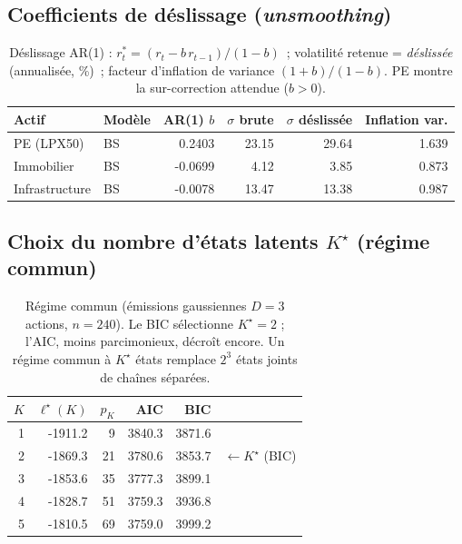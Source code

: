 \documentclass[11pt,a4paper]{article}
\theoremstyle{definition}
\begin{document}
\subsection{Coefficients de déslissage (\emph{unsmoothing})}
\begin{table}[H]\centering\small\renewcommand{\arraystretch}{1.25}\setlength{\tabcolsep}{6pt}
\begin{tabularx}{\textwidth}{@{}l X r r r r@{}}
\toprule
\textbf{Actif} & \textbf{Modèle} & \textbf{AR(1) $b$} & \textbf{$\sigma$ brute} & \textbf{$\sigma$ déslissée} & \textbf{Inflation var.}\\
\midrule
PE (LPX50) & BS & 0.2403 & 23.15 & 29.64 & 1.639\\
Immobilier & BS & -0.0699 & 4.12 & 3.85 & 0.873\\
Infrastructure & BS & -0.0078 & 13.47 & 13.38 & 0.987\\
\bottomrule\end{tabularx}
\caption{Déslissage AR(1) : $r^\ast_t=(r_t-b\,r_{t-1})/(1-b)$~; volatilité retenue = \emph{déslissée} (annualisée, \%)~; facteur d'inflation de variance $(1+b)/(1-b)$. PE montre la sur-correction attendue ($b>0$).}\label{tab:res-unsmooth}
\end{table}
\subsection{Choix du nombre d'états latents $K^\star$ (régime commun)}
\begin{table}[H]\centering\small\renewcommand{\arraystretch}{1.2}\setlength{\tabcolsep}{8pt}
\begin{tabular}{@{}r r r r r l@{}}
\toprule
$K$ & $\ell^\star(K)$ & $p_K$ & AIC & BIC & \\
\midrule
1 & -1911.2 & 9 & 3840.3 & 3871.6 & \\
2 & -1869.3 & 21 & 3780.6 & 3853.7 & $\leftarrow K^\star$ (BIC)\\
3 & -1853.6 & 35 & 3777.3 & 3899.1 & \\
4 & -1828.7 & 51 & 3759.3 & 3936.8 & \\
5 & -1810.5 & 69 & 3759.0 & 3999.2 & \\
\bottomrule\end{tabular}
\caption{Régime commun (émissions gaussiennes $D=3$ actions, $n=240$). Le BIC sélectionne $K^\star=2$ ; l'AIC, moins parcimonieux, décroît encore. Un régime commun à $K^\star$ états remplace $2^3$ états joints de chaînes séparées.}\label{tab:res-kselect}
\end{table}
\end{document}
